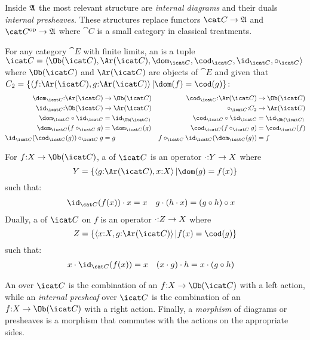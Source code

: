 \documentclass[csh.tex]{subfiles}
\begin{document}
Inside $\mathfrak A$ the most relevant structure are \emph{internal diagrams} and
their duals \emph{internal presheaves}. These structures replace functors 
$\cat C\to \ambient$ and $\cat C\dual\to \ambient$ where $\cat C$ is a small 
category in classical treatments.

\begin{definition}
  For any category $\cat E$ with finite limits, an  
  is a tuple
  $\icat C = \tuplet{\Ob(\icat C),\Ar(\icat C),\dom_{\icat C},\cod_{\icat C},\id_{\icat C},\circ_{\icat C}}$
  where $\Ob(\icat C)$ and $\Ar(\icat C)$ are objects of $\cat E$ and given that
  $C_2 = \set{\tuplet{f\of \Ar(\icat C),g\of \Ar(\icat C)}| \dom(f) = \cod(g) }$:
  \begin{align*}
  \dom_{\icat C} \of \Ar(\icat C)&\to \Ob(\icat C) &
  \cod_{\icat C} \of \Ar(\icat C) &\to \Ob(\icat C)\\
  \id_{\icat C} \of \Ob(\icat C)&\to \Ar(\icat C)&
  \circ_{\icat C} \of C_2&\to \Ar(\icat C)\\
  \dom_{\icat C}\circ\id_{\icat C} &= \id_{\Ob(\icat C)}&
  \cod_{\icat C}\circ\id_{\icat C} &= \id_{\Ob(\icat C)}\\
  \dom_{\icat C}(f\circ_{\icat C} g) &= \dom_{\icat C}(g)&
  \cod_{\icat C}(f\circ_{\icat C} g) &= \cod_{\icat C}(f)\\
  \id_{\icat C}(\cod_{\icat C}(g))\circ_{\icat C} g &= g &
  f\circ_{\icat C} \id_{\icat C}(\dom_{\icat C}(g)) &= f
  \end{align*}

  For $f\of X \to \Ob(\icat C)$, a  of $\icat C$ is an 
  operator $\cdot\mathord : Y \to X$ where \[Y = \set{\tuplet{g\of\Ar(\icat C),x\of X}|
  \dom(g) = f(x)}\] such that:
  \begin{align*}
    \id_{\cat C}(f(x))\cdot x &= x & 
    g \cdot (h\cdot x) &= (g\circ h)\circ x
  \end{align*}
  Dually, a  of $\icat C$ on $f$ is an 
  operator $\cdot\mathord : Z \to X$ where \[Z = \set{\tuplet{x\of X,g\of\Ar(\icat C)}|
  f(x) = \cod(g)}\] such that:
  \begin{align*}
    x\cdot\id_{\cat C}(f(x)) &= x & 
    (x\cdot g)\cdot h &= x\cdot(g\circ h)
  \end{align*}
  
  An  over $\icat C$ is the combination of an 
  $f\of X\to \Ob(\icat C)$ with a left action, while an \emph{internal presheaf}
  over $\icat C$ is the combination of an $f\of X\to \Ob(\icat C)$ with a right 
  action. Finally, a \emph{morphism} of diagrams or presheaves is a morphism that 
  commutes with the actions on the appropriate sides.
\end{definition}
\end{document}
